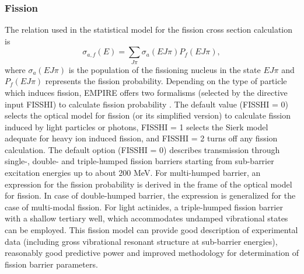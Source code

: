\documentclass[twocolumn,amsmath,amssymb,10pt,groupedaddress,a4paper]{revtex4}
\begin{document}
\subsubsection{Fission}

The relation used in the statistical model for the fission cross section
calculation is
\begin{equation}
\sigma_{a,f}(E)=\sum_{J\pi}\sigma_{a}(EJ\pi)P_{f}(EJ\pi),
\end{equation}
\noindent where $\sigma_{a}(EJ\pi)$ is the population of the fissioning nucleus
in the state $EJ\pi$ and $P_{f}(EJ\pi)$ represents the fission probability.
Depending on the type of particle which induces fission, EMPIRE
offers two formalisms (selected by the directive input FISSHI) to
calculate fission probability . The default value (FISSHI = 0) selects
the optical model for fission (or its simplified version) to calculate
fission induced by light particles or photons, FISSHI = 1 selects
the Sierk model adequate for heavy ion induced fission, and FISSHI
= 2 turns off any fission calculation.
The default option (FISSHI = 0)  describes transmission through single-,
double- and triple-humped fission barriers starting from sub-barrier
excitation energies up to about 200 MeV. For multi-humped barrier,
an expression for the fission probability is derived in the frame
of the optical model for fission. In case of double-humped barrier,
the expression is generalized for the case of multi-modal fission.
For light actinides, a triple-humped fission barrier with a shallow
tertiary well, which accommodates undamped vibrational states can
be employed. This fission model can provide good description of experimental
data (including gross vibrational resonant structure at sub-barrier
energies), reasonably good predictive power and improved methodology
for determination of fission barrier parameters.
\end{document}
